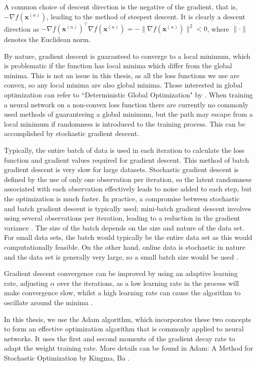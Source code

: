 \documentclass[honours,12pt]{unswthesis}
\numberwithin{equation}{section}
\theoremstyle{definition}
\begin{document}
A common choice of descent direction is the negative of the gradient, that is, $-\nabla f(\bm{x}^{(n)})$, leading to the method of steepest descent. It is clearly a descent direction as $-\nabla f(\bm{x}^{(n)})^\top\nabla f(\bm{x}^{(n)})=-\|\nabla f(\bm{x}^{(n)})\|^2<0$, where $\|\cdot\|$ denotes the Euclidean norm.

By nature, gradient descent is guaranteed to converge to a local minimum, which is problematic if the function has local minima which differ from the global minima. This is not an issue in this thesis, as all the loss functions we use are convex, so any local minima are also global minima. Those interested in global optimization can refer to ``Deterministic Global Optimization" by \citet{floudas}. When training a neural network on a non-convex loss function there are currently no commonly used methods of guaranteeing a global minimum, but the path may escape from a local minimum if randomness is introduced to the training process. This can be accomplished by stochastic gradient descent.

Typically, the entire batch of data is used in each iteration to calculate the loss function and gradient values required for gradient descent. This method of batch gradient descent is very slow for large datasets. Stochastic gradient descent is defined by the use of only one observation per iteration, so the latent randomness associated with each observation effectively leads to noise added to each step, but the optimization is much faster. In practice, a compromise between stochastic and batch gradient descent is typically used; mini-batch gradient descent involves using several observations per iteration, leading to a reduction in the gradient variance \citep{batch, optimneural}. The size of the batch depends on the size and nature of the data set. For small data sets, the batch would typically be the entire data set as this would computationally feasible. On the other hand, online data is stochastic in nature and the data set is generally very large, so a small batch size would be used \citep{bengio}.

Gradient descent convergence can be improved by using an adaptive learning rate, adjusting $\alpha$ over the iterations, as a low learning rate in the process will make convergence slow, whilst a high learning rate can cause the algorithm to oscillate around the minima \citep{optimneural}.

In this thesis, we use the Adam algorithm, which incorporates these two concepts to form an effective optimization algorithm that is commonly applied to neural networks. It uses the first and second moments of the gradient decay rate to adapt the weight training rate. More details can be found in Adam: A Method for Stochastic Optimization by Kingma, Ba \citep{adam}.
\end{document}
